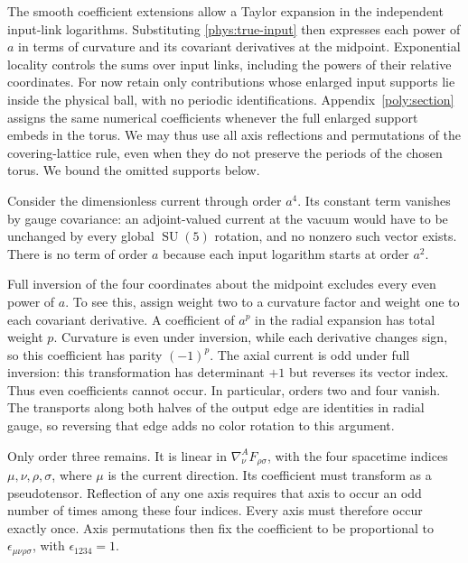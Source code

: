 \documentclass[11pt,a4paper]{article}
\theoremstyle{remark}
\DeclareMathOperator{\SU}{SU}
\begin{document}
The smooth coefficient extensions allow a Taylor expansion in the
independent input-link logarithms. Substituting \eqref{phys:true-input}
then expresses each power of $a$ in terms of curvature and its
covariant derivatives at the midpoint. Exponential locality controls
the sums over input links, including the powers of their relative
coordinates. For now retain only contributions whose enlarged input
supports lie inside the physical ball, with no periodic identifications.
Appendix~\ref{poly:section} assigns the same numerical coefficients
whenever the full enlarged support embeds in the torus. We may thus use
all axis reflections and permutations of the covering-lattice rule,
even when they do not preserve the periods of the chosen torus. We
bound the omitted supports below.

Consider the dimensionless current through order $a^4$. Its constant
term vanishes by gauge covariance: an adjoint-valued current at the
vacuum would have to be unchanged by every global $\SU(5)$ rotation,
and no nonzero such vector exists. There is no term of order $a$
because each input logarithm starts at order $a^2$.

Full inversion of the four coordinates about the midpoint excludes
every even power of $a$. To see this, assign weight two to a curvature
factor and weight one to each covariant derivative. A coefficient of
$a^p$ in the radial expansion has total weight $p$. Curvature is even
under inversion, while each derivative changes sign, so this
coefficient has parity $(-1)^p$. The axial current is odd under full
inversion: this transformation has determinant $+1$ but reverses its
vector index. Thus even coefficients cannot occur. In particular,
orders two and four vanish. The transports along both halves of the
output edge are identities in radial gauge, so reversing that edge
adds no color rotation to this argument.

Only order three remains. It is linear in
$\nabla_\nu^A F_{\rho\sigma}$, with the four spacetime indices
$\mu,\nu,\rho,\sigma$, where $\mu$ is the current direction. Its
coefficient must transform as a pseudotensor. Reflection of any one
axis requires that axis to occur an odd number of times among these
four indices. Every axis must therefore occur exactly once. Axis
permutations then fix the coefficient to be proportional to
$\epsilon_{\mu\nu\rho\sigma}$, with $\epsilon_{1234}=1$.
\end{document}
